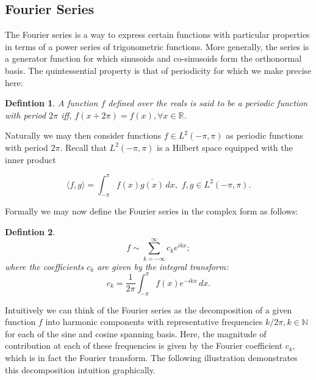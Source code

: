 \documentclass{article}
\newtheorem{defn}{Defintion}[section]
\begin{document}
\subsection{Fourier Series}

The Fourier series is a way to express certain functions with particular
properties in terms of a power series of trigonometric functions. More
generally, the series is a generator function for which sinusoids and
co-sinusoids form the orthonormal basis. The quintessential property is that of
periodicity for which we make precise here:

\begin{defn}
  A function $f$ defined over the reals is said to be a \emph{periodic
  function} with period $2\pi$ iff, $f(x + 2\pi) = f(x), \forall x \in \mathbb{R}$.
\end{defn}

Naturally we may then consider functions $f \in L^2(-\pi,\pi)$ as periodic
functions with period $2\pi$. Recall that $L^2(-\pi,\pi)$ is a Hilbert space
equipped with the inner product

\[
  \langle f,g \rangle = \int_{-\pi}^{\pi} f(x) \overline{g(x)} \, dx,
  \,\, f,g \in L^2(-\pi,\pi).
\]

Formally we may now define the Fourier series in the complex form as follows:

\begin{defn}
  \[
    f \sim \sum_{k=-\infty}^{\infty} c_k e^{ikx};
  \]
  where the coefficients $c_k$ are given by the integral transform:
  \[
    c_k = \frac{1}{2\pi} \int_{-\pi}^{\pi} f(x) e^{-ikx} \, dx.
  \]
\end{defn}

Intuitively we can think of the Fourier series as the decomposition of a given
function $f$ into harmonic components with representative frequencies $k/2\pi,
k\in\mathbb{N}$ for each of the sine and cosine spanning basis. Here, the
magnitude of contribution at each of these frequencies is given by the Fourier
coefficient $c_k$, which is in fact the Fourier transform.  The following
illustration demonstrates this decomposition intuition graphically.
\end{document}
